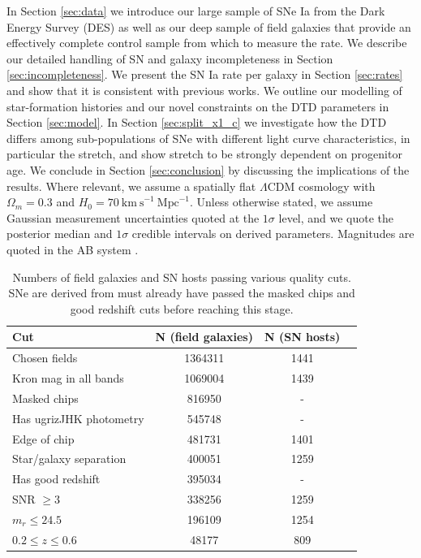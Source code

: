 \documentclass[fleqn,usenatbib]{mnras}
\begin{document}
In Section \ref{sec:data} we introduce our large sample of SNe Ia from the Dark Energy Survey (DES) as well as our deep sample of field galaxies that provide an effectively complete control sample from which to measure the rate. We describe our detailed handling of SN and galaxy incompleteness in Section \ref{sec:incompleteness}. We present the SN Ia rate per galaxy in Section \ref{sec:rates} and show that it is consistent with previous works. We outline our modelling of star-formation histories and our novel constraints on the DTD parameters in Section \ref{sec:model}. In Section \ref{sec:split_x1_c} we investigate how the DTD differs among sub-populations of SNe with different light curve characteristics, in particular the stretch, and show stretch to be strongly dependent on progenitor age. We conclude in Section \ref{sec:conclusion} by discussing the implications of the results.
Where relevant, we assume a spatially flat $\Lambda$CDM cosmology with $\Omega_m = 0.3$ and $H_0 = 70 \mathrm{~km~s}^{-1}~\mathrm{Mpc}^{-1}$. Unless otherwise stated, we assume Gaussian measurement uncertainties quoted at the $1\sigma$ level, and we quote the posterior median and $1\sigma$ credible intervals on derived parameters. Magnitudes are quoted in the AB system \citep{Oke1983}.


\begin{table}
	\centering
	\caption{Numbers of field galaxies and SN hosts passing various quality cuts. SNe are derived from must already have passed the masked chips and good redshift cuts before reaching this stage.}
	\label{tab:cuts}
	\begin{tabular}{lccr} %
		\hline
		Cut & N (field galaxies)  & N (SN hosts)\\
		\hline
		Chosen fields & 1364311  & 1441\\
	    Kron mag in all bands & 1069004  & 1439 \\
	    Masked chips & 816950  & - \\
	    Has ugrizJHK photometry & 545748  & -\\
	    Edge of chip & 481731 & 1401 \\
	    Star/galaxy separation & 400051 &  1259\\
	    Has good redshift & 395034 & - \\
	    SNR $\geq 3$& 338256  & 1259 \\
	    $m_r \leq 24.5$ & 196109 &  1254 \\
	    $0.2 \leq z \leq 0.6$ & 48177 & 809\\ 

		\hline
	\end{tabular}
\end{table}
\end{document}
